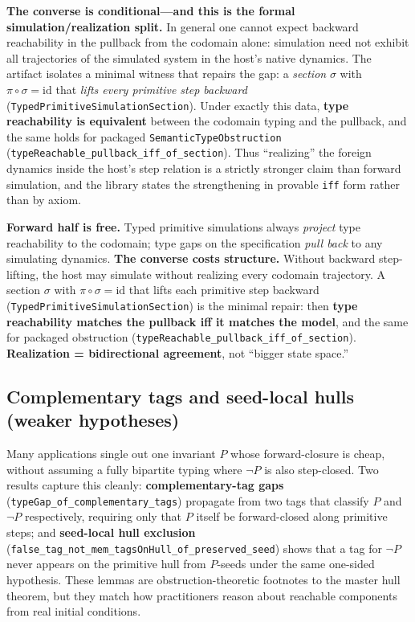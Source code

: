 \documentclass[11pt]{article}
\theoremstyle{plain}
\theoremstyle{definition}
\theoremstyle{remark}
\begin{document}
\medskip
\noindent
\textbf{The converse is conditional---and this is the formal simulation/realization split.}
In general one cannot expect backward reachability in the pullback from the codomain alone:
simulation need not exhibit all trajectories of the simulated system in the host's native
dynamics.  The artifact isolates a minimal witness that repairs the gap: a \emph{section}
$\sigma$ with $\pi \circ \sigma = \mathrm{id}$ that \emph{lifts every primitive step backward}
(\texttt{TypedPrimitiveSimulationSection}).  Under exactly this data, \textbf{type
reachability is equivalent} between the codomain typing and the pullback, and the same
holds for packaged \texttt{SemanticTypeObstruction} (\texttt{typeReachable\_pullback\_iff\_of\_section}).
Thus ``realizing'' the foreign dynamics inside the host's step relation is a strictly
stronger claim than forward simulation, and the library states the strengthening in
provable \texttt{iff} form rather than by axiom.

\begin{keybox}[title={Simulation vs.\ realization (machine-checked split)}]
\textbf{Forward half is free.}  Typed primitive simulations always \emph{project} type
reachability to the codomain; type gaps on the specification \emph{pull back} to any
simulating dynamics.
\textbf{The converse costs structure.}  Without backward step-lifting, the host may
simulate without realizing every codomain trajectory.  A section $\sigma$ with
$\pi\circ\sigma=\mathrm{id}$ that lifts each primitive step backward
(\texttt{TypedPrimitiveSimulationSection}) is the minimal repair: then \textbf{type
reachability matches the pullback iff it matches the model}, and the same for packaged
obstruction (\texttt{typeReachable\_pullback\_iff\_of\_section}).  \textbf{Realization =
bidirectional agreement}, not ``bigger state space.''
\end{keybox}

\subsection*{Complementary tags and seed-local hulls (weaker hypotheses)}

Many applications single out one invariant $P$ whose forward-closure is cheap, without
assuming a fully bipartite typing where $\neg P$ is also step-closed.  Two results capture
this cleanly: \textbf{complementary-tag gaps} (\texttt{typeGap\_of\_complementary\_tags})
propagate from two tags that classify $P$ and $\neg P$ respectively, requiring only that
$P$ itself be forward-closed along primitive steps; and \textbf{seed-local hull exclusion}
(\texttt{false\_tag\_not\_mem\_tagsOnHull\_of\_preserved\_seed}) shows that a tag for
$\neg P$ never appears on the primitive hull from $P$-seeds under the same one-sided
hypothesis.  These lemmas are obstruction-theoretic footnotes to the master hull theorem,
but they match how practitioners reason about reachable components from real initial
conditions.
\end{document}
